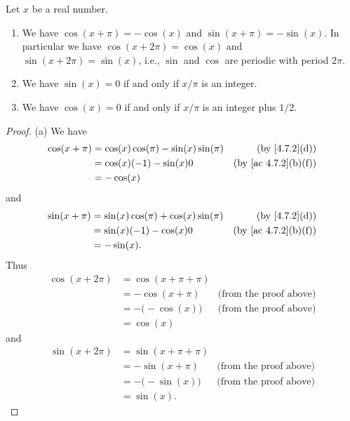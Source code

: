 \begin{theorem}\label{4.7.5}
  Let \(x\) be a real number.
  \begin{enumerate}
    \item We have \(\cos(x + \pi) = -\cos(x)\) and \(\sin(x + \pi) = -\sin(x)\).
          In particular we have \(\cos(x + 2\pi) = \cos(x)\) and \(\sin(x + 2\pi) = \sin(x)\), i.e., \(\sin\) and \(\cos\) are periodic with period \(2\pi\).
    \item We have \(\sin(x) = 0\) if and only if \(x / \pi\) is an integer.
    \item We have \(\cos(x) = 0\) if and only if \(x / \pi\) is an integer plus \(1 / 2\).
  \end{enumerate}
\end{theorem}

\begin{proof}{(a)}
  We have
  \begin{align*}
    \cos(x + \pi) & = \cos(x) \cos(\pi) - \sin(x) \sin(\pi) & \text{(by \cref{4.7.2}(d))}       \\
                  & = \cos(x) (-1) - \sin(x) 0              & \text{(by \cref{ac 4.7.2}(b)(f))} \\
                  & = -\cos(x)
  \end{align*}
  and
  \begin{align*}
    \sin(x + \pi) & = \sin(x) \cos(\pi) + \cos(x) \sin(\pi) & \text{(by \cref{4.7.2}(d))}       \\
                  & = \sin(x) (-1) - \cos(x) 0              & \text{(by \cref{ac 4.7.2}(b)(f))} \\
                  & = -\sin(x).
  \end{align*}
  Thus
  \begin{align*}
    \cos(x + 2\pi) & = \cos(x + \pi + \pi)                                 \\
                   & = -\cos(x + \pi)      & \text{(from the proof above)} \\
                   & = -\big(-\cos(x)\big) & \text{(from the proof above)} \\
                   & = \cos(x)
  \end{align*}
  and
  \begin{align*}
    \sin(x + 2\pi) & = \sin(x + \pi + \pi)                                 \\
                   & = -\sin(x + \pi)      & \text{(from the proof above)} \\
                   & = -\big(-\sin(x)\big) & \text{(from the proof above)} \\
                   & = \sin(x).
  \end{align*}
\end{proof}

